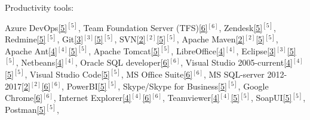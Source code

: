 \begin{cventries}
  \cventry
    {Productivity tools:} %
    {} %
    {} %
    {} %
    {
      \vspace{0.1cm}
      \begin{cvitems} %
        \item[] {        
        \textcolor{rainbowcolor-green}{Azure DevOps\ref{5}{$^{[5]}$}},         
        \textcolor{rainbowcolor-green}{Team Foundation Server (TFS)\ref{6}{$^{[6]}$}},
        \textcolor{rainbowcolor-green}{Zendesk\ref{5}{$^{[5]}$}},
        \textcolor{rainbowcolor-green}{Redmine\ref{5}{$^{[5]}$}},
        \textcolor{rainbowcolor-green}{Git\ref{3}{$^{[3]}$}\ref{5}{$^{[5]}$}}, 
        \textcolor{rainbowcolor-green}{SVN\ref{2}{$^{[2]}$}\ref{5}{$^{[5]}$}},
        \textcolor{rainbowcolor-green}{Apache Maven\ref{2}{$^{[2]}$}\ref{5}{$^{[5]}$}},
        \textcolor{rainbowcolor-green}{Apache Ant\ref{4}{$^{[4]}$}\ref{5}{$^{[5]}$}},  
        \textcolor{rainbowcolor-green}{Apache Tomcat\ref{5}{$^{[5]}$}}, 
        \textcolor{rainbowcolor-green}{LibreOffice\ref{4}{$^{[4]}$}}, 
        \textcolor{rainbowcolor-green}{Eclipse\ref{3}{$^{[3]}$}\ref{5}{$^{[5]}$}},  
        \textcolor{rainbowcolor-green}{Netbeans\ref{4}{$^{[4]}$}}, 
        \textcolor{rainbowcolor-green}{Oracle SQL developer\ref{6}{$^{[6]}$}},
        \textcolor{rainbowcolor-green}{Visual Studio 2005-current\ref{4}{$^{[4]}$}\ref{5}{$^{[5]}$}},
        \textcolor{rainbowcolor-green}{Visual Studio Code\ref{5}{$^{[5]}$}},
        \textcolor{rainbowcolor-green}{MS Office Suite\ref{6}{$^{[6]}$}},
        \textcolor{rainbowcolor-green}{MS SQL-server 2012-2017\ref{2}{$^{[2]}$}\ref{6}{$^{[6]}$}},
		\textcolor{rainbowcolor-green}{PowerBI\ref{5}{$^{[5]}$}}, 
        \textcolor{rainbowcolor-green}{Skype/Skype for Business\ref{5}{$^{[5]}$}},
        \textcolor{rainbowcolor-green}{Google Chrome\ref{6}{$^{[6]}$}},                
        \textcolor{rainbowcolor-green}{Internet Explorer\ref{4}{$^{[4]}$}\ref{6}{$^{[6]}$}},
        \textcolor{rainbowcolor-green}{Teamviewer\ref{4}{$^{[4]}$}\ref{5}{$^{[5]}$}},
        \textcolor{rainbowcolor-green}{SoapUI\ref{5}{$^{[5]}$}},
        \textcolor{rainbowcolor-green}{Postman\ref{5}{$^{[5]}$}},
}
\end{cvitems}}
\end{cventries}
